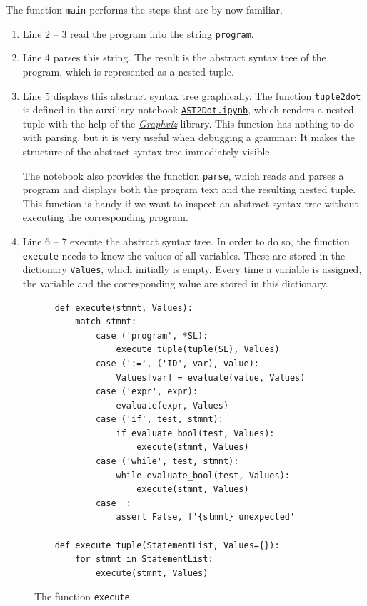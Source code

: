 \noindent
The function \texttt{main} performs the steps that are by now familiar.
\begin{enumerate}
\item Line 2 -- 3 read the program into the string \texttt{program}.
\item Line 4 parses this string.  The result is the abstract syntax tree of the program, which is represented
      as a nested tuple.
\item Line 5 displays this abstract syntax tree graphically.  The function \texttt{tuple2dot} is defined in
      the auxiliary notebook
      \href{https://github.com/karlstroetmann/Formal-Languages/blob/master/Python/Chapter-08/AST2Dot.ipynb}{\texttt{AST2Dot.ipynb}},
      which renders a nested tuple with the help of the
      \href{https://graphviz.org}{\textsl{Graphviz}} library.  This function has nothing to do with
      parsing, but it is very useful when debugging a grammar:  It makes the structure of the abstract
      syntax tree immediately visible.

      The notebook also provides the function \texttt{parse}, which reads and parses a program and displays
      both the program text and the resulting nested tuple.  This function is handy if we want to inspect an
      abstract syntax tree without executing the corresponding program.
\item Line 6 -- 7 execute the abstract syntax tree.  In order to do so, the function \texttt{execute} needs
      to know the values of all variables.  These are stored in the dictionary \texttt{Values}, which
      initially is empty.  Every time a variable is assigned, the variable and the corresponding value are
      stored in this dictionary.
\end{enumerate}

\begin{figure}[!ht]
\centering
\begin{verbatim}
    def execute(stmnt, Values):
        match stmnt:
            case ('program', *SL):
                execute_tuple(tuple(SL), Values)
            case (':=', ('ID', var), value):
                Values[var] = evaluate(value, Values)
            case ('expr', expr):
                evaluate(expr, Values)
            case ('if', test, stmnt):
                if evaluate_bool(test, Values):
                    execute(stmnt, Values)
            case ('while', test, stmnt):
                while evaluate_bool(test, Values):
                    execute(stmnt, Values)
            case _:
                assert False, f'{stmnt} unexpected'

    def execute_tuple(StatementList, Values={}):
        for stmnt in StatementList:
            execute(stmnt, Values)
\end{verbatim}
\vspace*{-0.3cm}
\caption{The function \texttt{execute}.}
\label{fig:Interpreter.ipynb:execute}
\end{figure}


